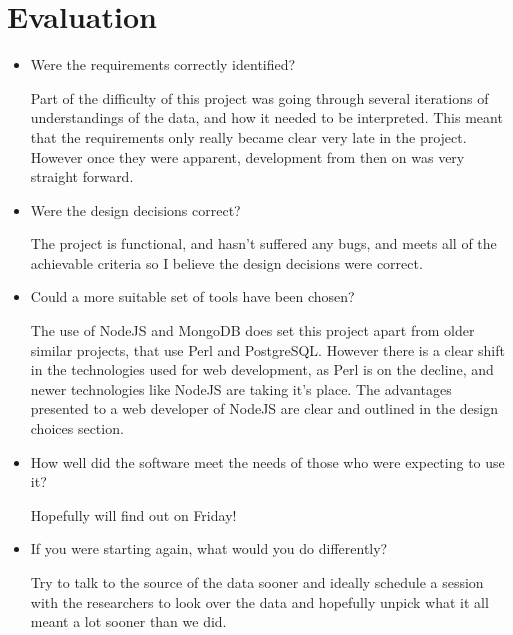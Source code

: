 \chapter{Evaluation}


\begin{itemize}
   \item Were the requirements correctly identified? 

     Part of the difficulty of this project was going through several iterations of understandings of the data, and how it needed to be interpreted. This meant that the requirements only really became clear very late in the project. However once they were apparent, development from then on was very straight forward. 

   \item Were the design decisions correct?

     The project is functional, and hasn't suffered any bugs, and meets all of the achievable criteria so I believe the design decisions were correct.

   \item Could a more suitable set of tools have been chosen?

     The use of NodeJS and MongoDB does set this project apart from older similar projects, that use Perl and PostgreSQL. However there is a clear shift in the technologies used for web development, as Perl is on the decline\cite{needed}, and newer technologies like NodeJS are taking it's place. The advantages presented to a web developer of NodeJS are clear and outlined in the design choices section. 

   \item How well did the software meet the needs of those who were expecting to use it?

     Hopefully will find out on Friday!

   \item If you were starting again, what would you do differently?

     Try to talk to the source of the data sooner and ideally schedule a session with the researchers to look over the data and hopefully unpick what it all meant a lot sooner than we did. 
\end{itemize}


